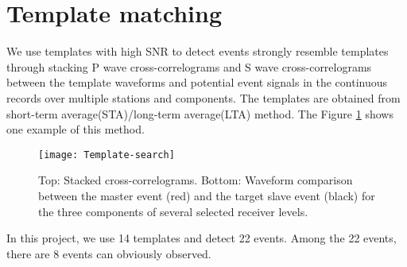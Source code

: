 \section{Template matching}
We use templates with high SNR to detect events strongly resemble templates through stacking P wave cross-correlograms and S wave cross-correlograms between the template waveforms and potential event signals in the continuous records over multiple stations and components. The templates are obtained from  short-term average(STA)/long-term average(LTA) method. The Figure \ref{fig:method} shows one example of this method.
\begin{figure}[htbp] 
\centering 
\texttt{[image: Template-search]} 
\caption{\label{fig:method} Top: Stacked cross-correlograms. Bottom: Waveform comparison between the master event (red) and the target slave event (black) for the three components of several selected receiver levels.} 
\end{figure}
In this project, we use 14 templates and detect 22 events. Among the 22 events, there are 8 events can obviously observed.

